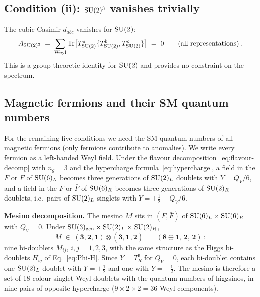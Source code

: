 \documentclass[11pt,a4paper]{article}
\begin{document}
\subsection{Condition (ii): $\mathrm{SU}(2)^3$ vanishes trivially}

The cubic Casimir $d_{abc}$ vanishes for $\mathrm{SU}(2)$:
\begin{equation}\label{eq:su2-cubic}
  A_{\mathrm{SU}(2)^3} \;=\; \sum_{\text{Weyl}} \mathrm{Tr}\bigl[T^a_{\mathrm{SU}(2)} \{T^b_{\mathrm{SU}(2)}, T^c_{\mathrm{SU}(2)}\}\bigr]
  \;=\; 0
  \qquad\text{(all representations)}\,.
\end{equation}
This is a group-theoretic identity for $\mathrm{SU}(2)$ and provides no
constraint on the spectrum.

\subsection{Magnetic fermions and their SM quantum numbers}

For the remaining five conditions we need the SM quantum numbers of all
magnetic fermions (only fermions contribute to anomalies).  We write
every fermion as a left-handed Weyl field.  Under the flavour
decomposition~\eqref{eq:flavour-decomp} with $n_g = 3$ and the
hypercharge formula~\eqref{eq:hypercharge}, a field in the $F$ or
$\bar{F}$ of $\mathrm{SU}(6)_L$ becomes three generations of $\mathrm{SU}(2)_L$
doublets with $Y = Q_V/6$, and a field in the $F$ or $\bar{F}$ of
$\mathrm{SU}(6)_R$ becomes three generations of $\mathrm{SU}(2)_R$ doublets, i.e.\
pairs of $\mathrm{SU}(2)_L$ singlets with $Y = \pm\tfrac{1}{2} + Q_V/6$.

\textbf{Mesino decomposition.}  The mesino $M$ sits in
$(F, \bar{F})$ of $\mathrm{SU}(6)_L \times \mathrm{SU}(6)_R$ with $Q_V = 0$.  Under
$\mathrm{SU}(3)_{\mathrm{gen}} \times \mathrm{SU}(2)_L \times \mathrm{SU}(2)_R$,
\begin{equation}\label{eq:mesino-decomp}
  M \;\in\; (\mathbf{3}, \mathbf{2}, \mathbf{1}) \otimes
  (\bar{\mathbf{3}}, \mathbf{1}, \mathbf{2})
  \;=\; (\mathbf{8} \oplus \mathbf{1},\, \mathbf{2},\, \mathbf{2})\,:
\end{equation}
nine bi-doublets $M_{ij}$, $i,j = 1,2,3$, with the same structure as the
Higgs bi-doublets $H_{ij}$ of Eq.~\eqref{eq:Phi-H}.  Since $Y = T_R^3$
for $Q_V = 0$, each bi-doublet contains one $\mathrm{SU}(2)_L$ doublet with
$Y = +\tfrac{1}{2}$ and one with $Y = -\tfrac{1}{2}$.  The mesino is
therefore a set of 18 colour-singlet Weyl doublets with the quantum
numbers of higgsinos, in nine pairs of opposite hypercharge
($9 \times 2 \times 2 = 36$ Weyl components).
\end{document}
